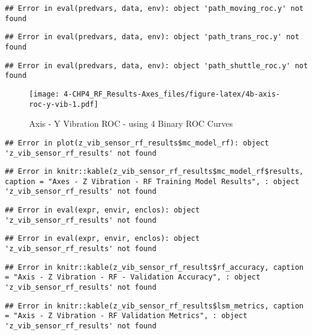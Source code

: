 \documentclass[]{article}
\begin{document}
\begin{verbatim}
## Error in eval(predvars, data, env): object 'path_moving_roc.y' not found
\end{verbatim}

\begin{verbatim}
## Error in eval(predvars, data, env): object 'path_trans_roc.y' not found
\end{verbatim}

\begin{verbatim}
## Error in eval(predvars, data, env): object 'path_shuttle_roc.y' not found
\end{verbatim}

\begin{figure}
\centering
\texttt{[image: 4-CHP4\_RF\_Results-Axes\_files/figure-latex/4b-axis-roc-y-vib-1.pdf]}
\caption{Axis - Y Vibration ROC - using 4 Binary ROC Curves}
\end{figure}

\begin{verbatim}
## Error in plot(z_vib_sensor_rf_results$mc_model_rf): object 'z_vib_sensor_rf_results' not found
\end{verbatim}

\begin{verbatim}
## Error in knitr::kable(z_vib_sensor_rf_results$mc_model_rf$results, caption = "Axes - Z Vibration - RF Training Model Results", : object 'z_vib_sensor_rf_results' not found
\end{verbatim}

\begin{verbatim}
## Error in eval(expr, envir, enclos): object 'z_vib_sensor_rf_results' not found
\end{verbatim}

\begin{verbatim}
## Error in eval(expr, envir, enclos): object 'z_vib_sensor_rf_results' not found
\end{verbatim}

\begin{verbatim}
## Error in knitr::kable(z_vib_sensor_rf_results$rf_accuracy, caption = "Axis - Z Vibration - RF - Validation Accuracy", : object 'z_vib_sensor_rf_results' not found
\end{verbatim}

\begin{verbatim}
## Error in knitr::kable(z_vib_sensor_rf_results$lsm_metrics, caption = "Axis - Z Vibration - RF Validation Metrics", : object 'z_vib_sensor_rf_results' not found
\end{verbatim}
\end{document}

